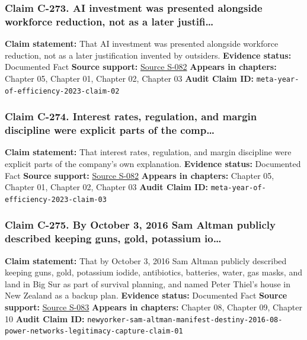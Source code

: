 \documentclass[
  american,
  11pt,
  letterpaper,
]{article}
\begin{document}
\subsubsection{Claim C-273. AI investment was presented alongside
workforce reduction, not as a later
justifi\ldots{}}\label{claim-c-273-ai-investment-was-presented-alongside-workforce-reduction-not-as-a-later-justifi}

\textbf{Claim statement:} That AI investment was presented alongside
workforce reduction, not as a later justification invented by outsiders.
\textbf{Evidence status:} Documented Fact \textbf{Source support:}
\hyperref[source-s-082-mark-zuckerberg-s-message-to-meta-employees]{Source
S-082} \textbf{Appears in chapters:} Chapter 05, Chapter 01, Chapter 02,
Chapter 03 \textbf{Audit Claim ID:}
\texttt{meta-year-of-efficiency-2023-claim-02}

\subsubsection{Claim C-274. Interest rates, regulation, and margin
discipline were explicit parts of the
comp\ldots{}}\label{claim-c-274-interest-rates-regulation-and-margin-discipline-were-explicit-parts-of-the-comp}

\textbf{Claim statement:} That interest rates, regulation, and margin
discipline were explicit parts of the company's own explanation.
\textbf{Evidence status:} Documented Fact \textbf{Source support:}
\hyperref[source-s-082-mark-zuckerberg-s-message-to-meta-employees]{Source
S-082} \textbf{Appears in chapters:} Chapter 05, Chapter 01, Chapter 02,
Chapter 03 \textbf{Audit Claim ID:}
\texttt{meta-year-of-efficiency-2023-claim-03}

\subsubsection{Claim C-275. By October 3, 2016 Sam Altman publicly
described keeping guns, gold, potassium
io\ldots{}}\label{claim-c-275-by-october-3-2016-sam-altman-publicly-described-keeping-guns-gold-potassium-io}

\textbf{Claim statement:} That by October 3, 2016 Sam Altman publicly
described keeping guns, gold, potassium iodide, antibiotics, batteries,
water, gas masks, and land in Big Sur as part of survival planning, and
named Peter Thiel's house in New Zealand as a backup plan.
\textbf{Evidence status:} Documented Fact \textbf{Source support:}
\hyperref[source-s-083-sam-altman-s-manifest-destiny]{Source S-083}
\textbf{Appears in chapters:} Chapter 08, Chapter 09, Chapter 10
\textbf{Audit Claim ID:}
\texttt{newyorker-sam-altman-manifest-destiny-2016-08-power-networks-legitimacy-capture-claim-01}
\end{document}
